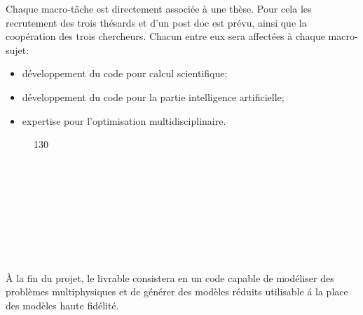 \documentclass[french]{article}
\begin{document}
Chaque macro-tâche est directement associ\'ee \`a une thèse. Pour cela les recrutement des trois thésards et d'un post doc est prévu, ainsi que la coopération des trois chercheurs. Chacun entre eux sera affect\'ees \`a chaque macro-sujet:
\begin{itemize}
\item développement du code pour calcul scientifique;
\item développement du code pour la partie intelligence artificielle;
\item expertise pour l'optimisation multidisciplinaire.
\end{itemize} 
\begin{figure}[h!]
	\begin{center}
	\begin{ganttchart}[y unit title=0.6cm,
		y unit chart=0.6cm, 
		x unit=0.4cm,
		vgrid,hgrid, 
		title label anchor/.style={below=-1.6ex},
		title left shift=.05,
		title right shift=-.05,
		title height=1,
		progress label text={},
		bar height=0.7,
		group right shift=0,
		group top shift=.6,
		group height=.4]{1}{30}
		 \\
		 \\
		 \\
		 \\
		 \\
		 \\
		 \\
		 \\
		 \\
	\end{ganttchart}
	\end{center}		
\end{figure}

\`A la fin du projet, le livrable consistera en un code capable de modéliser des problèmes multiphysiques et de générer des modèles réduits utilisable \'a la place des modèles haute fidélité.
\end{document}
